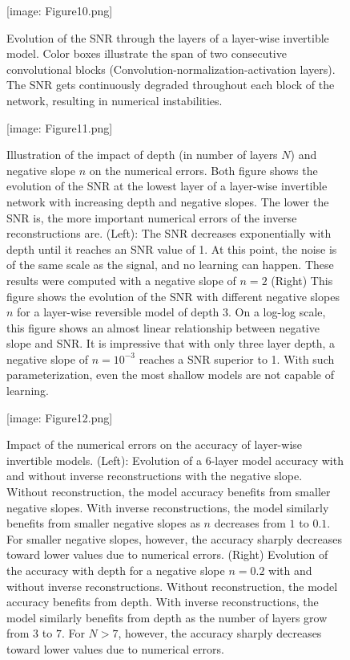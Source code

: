 \documentclass[twocolumn]{bmcart}
\def\texttt{[image: ]}
\begin{document}
\begin{backmatter}
\begin{figure}[t]
\texttt{[image: Figure10.png]}
\caption{
Evolution of the SNR through the layers of a layer-wise invertible model.
Color boxes illustrate the span of two consecutive convolutional blocks (Convolution-normalization-activation layers).
The SNR gets continuously degraded throughout each block of the network, resulting in numerical instabilities.
}
\end{figure}

\begin{figure}[t]
\texttt{[image: Figure11.png]}
\caption{
Illustration of the impact of depth (in number of layers $N$) and negative slope $n$ on the numerical errors.
Both figure shows the evolution of the SNR at the lowest layer of a layer-wise invertible network with increasing depth and negative slopes.
The lower the SNR is, the more  important numerical errors of the inverse reconstructions are.
(Left): The SNR decreases exponentially with depth until it reaches an SNR value of 1.
At this point, the noise is of the same scale as the signal, and no learning can happen.
These results were computed with a negative slope of $n=2$
(Right) This figure shows the evolution of the SNR with different negative slopes $n$ for a layer-wise reversible model of depth 3.
On a log-log scale, this figure shows an almost linear relationship between negative slope and SNR.
It is impressive that with only three layer depth, a negative slope of $n=10^{-3}$ reaches a SNR superior to 1.
With such parameterization, even the most shallow models are not capable of learning.
}
\end{figure}

\begin{figure}[t]
\texttt{[image: Figure12.png]}
\caption{
Impact of the numerical errors on the accuracy of layer-wise invertible models.
(Left): Evolution of a 6-layer model accuracy with and without inverse reconstructions with the negative slope.
Without reconstruction, the model accuracy benefits from smaller negative slopes.
With inverse reconstructions, the model similarly benefits from smaller negative slopes as $n$ decreases from $1$ to $0.1$.
For smaller negative slopes, however, the accuracy sharply decreases toward lower values due to numerical errors.
(Right) Evolution of the accuracy with depth for a negative slope $n=0.2$ with and without inverse reconstructions.
Without reconstruction, the model accuracy benefits from depth.
With inverse reconstructions, the model similarly benefits from depth as the number of layers grow from $3$ to $7$.
For $N>7$, however, the accuracy sharply decreases toward lower values due to numerical errors.
}
\end{figure}


\end{backmatter}
\end{document}
